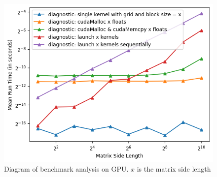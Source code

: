\begin{figure}[ht]
\includegraphics[width=\textwidth]{SavedBenchmarksAndDiagrams/Machine 2/Diagnostic/GPU Bench.png}
\caption{Diagram of benchmark analysis on GPU. $x$ is the matrix side length}
\label{fig:diagnostic_benchmark}
\end{figure}
